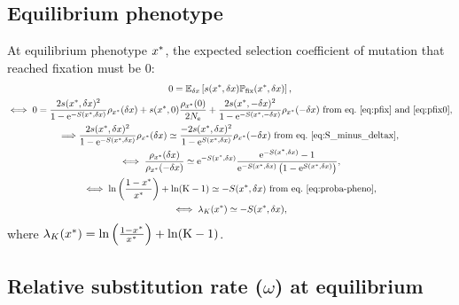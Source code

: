 \subsection{Equilibrium phenotype}
\label{subsec:equilibrium-phenotype}

At equilibrium phenotype $x^{*}$, the expected selection coefficient of mutation that reached fixation must be $0$:
\begin{gather}
 0 = \operatorname{\mathbb{E}}_{\delta x} \left[ s(x^{*}, \delta x) \mathbb{P}_{\mathrm{fix}}(x^{*}, \delta x) \right], \\
\iff 0 = \frac{ 2 s(x^{*}, \delta x)^2}{1 - \mathrm{e}^{-S(x^{*}, \delta x)}}   \rho_{x^{*}}(\delta x) + s(x^{*}, 0) \frac{ \rho_{x^{*}}(0)}{2N_{\mathrm{e}}} + \frac{ 2s(x^{*}, -\delta x)^2}{1 - \mathrm{e}^{-S(x^{*}, -\delta x)}} \rho_{x^{*}}(-\delta x)\text{ from eq.~\ref{eq:pfix} and~\ref{eq:pfix0}}, \\
\Longrightarrow \frac{ 2s(x^{*}, \delta x)^2}{1 - \mathrm{e}^{-S(x^{*}, \delta x)}}   \rho_{x^{*}}(\delta x) \simeq \frac{ - 2s(x^{*}, \delta x)^2}{1 - \mathrm{e}^{S(x^{*}, \delta x)}}   \rho_{x^{*}}(-\delta x) \text{ from eq.~\ref{eq:S_minus_deltax}}, \\
\iff \frac{ \rho_{x^{*}}(\delta x)}{\rho_{x^{*}}(-\delta x)} \simeq \mathrm{e}^{-S(x^{*}, \delta x)} \frac{ \mathrm{e}^{-S(x^{*}, \delta x)} - 1}{ \mathrm{e}^{-S(x^{*}, \delta x)} \left( 1 - \mathrm{e}^{S(x^{*}, \delta x)} \right)}, \\
\iff \ln \left( \frac{1 - x^{*}}{x^{*}} \right) + \ln (\text{K}-1) \simeq -S(x^{*}, \delta x) \text{ from eq.~\ref{eq:proba-pheno}} \label{eq:equilibrium-pheno}, \\
\iff \lambda_{K}(x^{*}) \simeq -S(x^{*}, \delta x) \label{eq:equilibrium_lambda},
\end{gather}
where  $\lambda_{K}(x^{*}) = \ln \left( \frac{1 - x^{*}}{x^{*}} \right) + \ln (\text{K}-1)$.

\subsection{Relative substitution rate (\texorpdfstring{$\omega$}{ω}) at equilibrium}
\label{subsec:mean-scaled-fixation-probability-omega-at-equilibrium}

